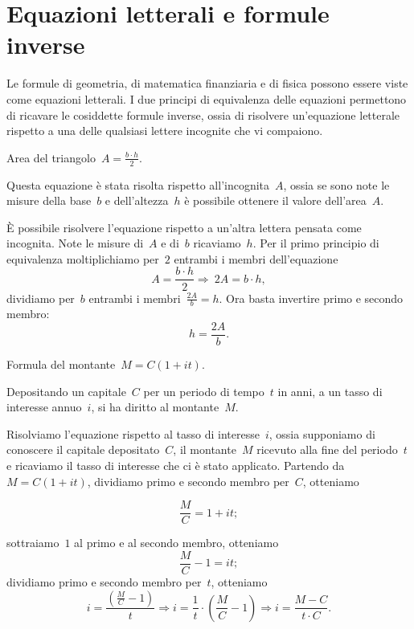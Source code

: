 \section{Equazioni letterali e formule inverse}
\label{sec:compl1_formuleinverse}

Le formule di geometria, di matematica finanziaria e di fisica possono essere 
viste come equazioni letterali.
I due principi di equivalenza delle equazioni permettono di ricavare le 
cosiddette formule inverse, ossia di risolvere
un'equazione letterale rispetto a una delle qualsiasi lettere incognite che vi 
compaiono.

 \begin{esempio}
Area del triangolo~$A=\frac{b\cdot h}{2}$.

Questa equazione è stata risolta rispetto all'incognita~$A$, ossia se sono 
note le misure della base~$b$ e dell'altezza~$h$
è possibile ottenere il valore dell'area~$A$.

È possibile risolvere l'equazione rispetto a un'altra lettera pensata come 
incognita.
Note le misure di~$A$ e di~$b$ ricaviamo~$h$. Per il primo principio di 
equivalenza moltiplichiamo per~$2$
entrambi i membri dell'equazione
\[A=\frac{b\cdot h}{2}\Rightarrow~2A=b\cdot h,\]
dividiamo per~$b$ entrambi i membri~$\frac{2A}{b}=h$.
Ora basta invertire primo e secondo membro: \[h=\frac{2A}{b}.\]
 \end{esempio}

 \begin{esempio}
Formula del montante~$M=C(1+it)$.

Depositando un capitale~$C$ per un periodo di tempo~$t$ in anni, a un tasso di 
interesse annuo~$i$,
si ha diritto al montante~$M$.

Risolviamo l'equazione rispetto al tasso di interesse~$i$, ossia supponiamo di 
conoscere il capitale depositato~$C$, il montante~$M$
ricevuto alla fine del periodo~$t$ e ricaviamo il tasso di interesse che ci è 
stato applicato.
Partendo da~$M=C(1+it)$, dividiamo primo e secondo membro per~$C$, otteniamo 

\[\frac{M}{C}=1+it;\]

sottraiamo~$1$ al primo e al secondo membro, otteniamo
\[\frac{M}{C}-1=it;\] dividiamo primo e secondo membro per~$t$,
otteniamo
\[i=\frac{\left(\frac{M}{C}-1\right)}{t}\Rightarrow%
i=\frac{1}{t}\cdot \left(\frac{M}{C}-1\right)\Rightarrow 
i=\frac{M-C}{t\cdot C}.\]
 \end{esempio}

